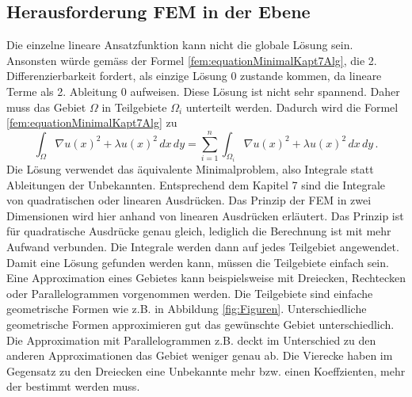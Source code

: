 \subsection{Herausforderung FEM in der Ebene}
Die einzelne lineare Ansatzfunktion kann nicht die globale Lösung sein. Ansonsten würde gemäss der Formel \eqref{fem:equationMinimalKapt7Alg}, die 2. Differenzierbarkeit fordert, als einzige Lösung 0 zustande kommen, da lineare Terme als 2. Ableitung 0 aufweisen. Diese Lösung ist nicht sehr spannend. Daher muss das Gebiet $\Omega$ in Teilgebiete $\Omega_i$ unterteilt werden. Dadurch wird die Formel \eqref{fem:equationMinimalKapt7Alg} zu
\begin{equation}
\int_{\Omega} \nabla u(x)^2 + \lambda u(x)^2 \, dx \, dy = \sum \limits_{i=1}^n \int_{\Omega_i} \nabla u(x)^2 + \lambda u(x)^2 \, dx \, dy \, .
\label{fem:equationSummGebiete}
\end{equation}
Die Lösung verwendet das äquivalente Minimalproblem, also Integrale statt Ableitungen der Unbekannten. Entsprechend dem Kapitel 7 sind die Integrale von quadratischen oder linearen Ausdrücken. Das Prinzip der FEM in zwei Dimensionen wird hier anhand von linearen Ausdrücken erläutert. Das Prinzip ist für quadratische Ausdrücke genau gleich, lediglich die Berechnung ist mit mehr Aufwand verbunden. Die Integrale werden dann auf jedes Teilgebiet angewendet. 
Damit eine Lösung gefunden werden kann, müssen die Teilgebiete einfach sein. Eine Approximation eines Gebietes kann beispielsweise mit Dreiecken, Rechtecken oder Parallelogrammen vorgenommen werden. Die Teilgebiete sind einfache geometrische Formen wie z.B. in Abbildung \ref{fig:Figuren}. Unterschiedliche geometrische Formen approximieren gut das gewünschte Gebiet unterschiedlich. Die Approximation mit Parallelogrammen z.B. deckt im Unterschied zu den anderen Approximationen das Gebiet weniger genau ab. Die Vierecke haben im Gegensatz zu den Dreiecken eine Unbekannte mehr bzw. einen Koeffzienten, mehr der bestimmt werden  muss.
